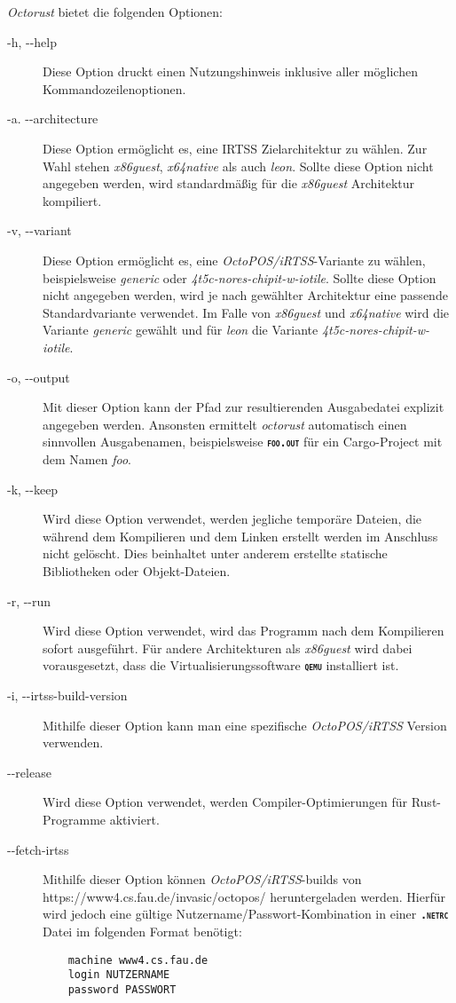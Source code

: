\textit{Octorust} bietet die folgenden Optionen:
\begin{description}

	\item[-h, -{}-help]
	Diese Option druckt einen Nutzungshinweis inklusive aller möglichen Kommandozeilenoptionen.
	
	\item[-a. -{}-architecture]
	Diese Option ermöglicht es, eine IRTSS Zielarchitektur zu wählen. Zur Wahl stehen \textit{x86guest},
	\textit{x64native} als auch \textit{leon}.
	Sollte diese Option nicht angegeben werden, wird standardmäßig für die \textit{x86guest} Architektur kompiliert.
	
	\item[-v, -{}-variant]
	Diese Option ermöglicht es, eine \textit{OctoPOS/iRTSS}-Variante zu wählen,
	beispielsweise \textit{generic} oder \textit{4t5c-nores-chipit-w-iotile}.
	Sollte diese Option nicht angegeben werden, wird je nach gewählter Architektur
	eine passende Standardvariante verwendet.
	Im Falle von \textit{x86guest} und \textit{x64native} wird die Variante \textit{generic} gewählt und für 
	\textit{leon} die Variante \textit{4t5c-nores-chipit-w-iotile}.
	
	\item[-o, -{}-output]
	Mit dieser Option kann der Pfad zur resultierenden Ausgabedatei explizit angegeben	werden.
	Ansonsten ermittelt \textit{octorust} automatisch einen sinnvollen Ausgabenamen,
	beispielsweise \texttt{\textsc{\textbf{foo.out}}} für ein Cargo-Project mit dem Namen
	\textit{foo}.
	
	\item[-k, -{}-keep]
	Wird diese Option verwendet, werden jegliche temporäre Dateien,
	die während dem Kompilieren und dem Linken erstellt werden im
	Anschluss nicht gelöscht.
	Dies beinhaltet unter anderem erstellte statische Bibliotheken oder Objekt-Dateien.
	
	\item[-r, -{}-run]
	Wird diese Option verwendet, wird das Programm nach dem Kompilieren sofort ausgeführt.
	Für andere Architekturen als \textit{x86guest} wird dabei vorausgesetzt,
	dass die Virtualisierungssoftware \texttt{\textsc{\textbf{qemu}}} installiert ist.
	
	\item[-i, -{}-irtss-build-version]
	Mithilfe dieser Option kann man eine spezifische \textit{OctoPOS/iRTSS} Version verwenden.
	
	\item[-{}-release]
	Wird diese Option verwendet, werden Compiler-Optimierungen für Rust-Programme aktiviert.
	
	\item[-{}-fetch-irtss]
	Mithilfe dieser Option können \textit{OctoPOS/iRTSS}-builds von \\
	https://www4.cs.fau.de/invasic/octopos/ heruntergeladen werden. Hierfür wird jedoch
	eine gültige Nutzername/Passwort-Kombination in einer \texttt{\textsc{\textbf{.netrc}}}
	Datei im folgenden Format benötigt:
	\begin{verbatim}
	machine www4.cs.fau.de
	login NUTZERNAME
	password PASSWORT
	\end{verbatim}
\end{description}
